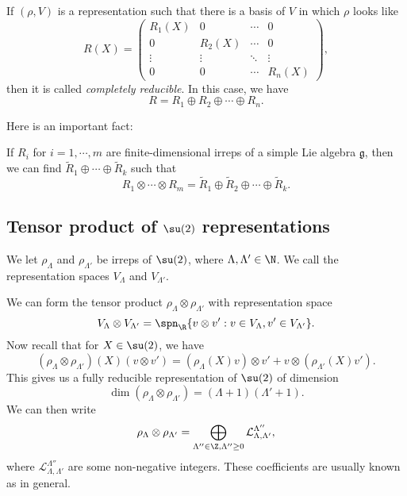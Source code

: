 \documentclass[a4paper]{article}
\begin{document}
\begin{defi}
  If $(\rho, V)$ is a representation such that there is a basis of $V$ in which $\rho$ looks like
  \[
    R(X) =
    \begin{pmatrix}
      R_1(X) & 0 & \cdots & 0\\
      0 & R_2(X) & \cdots & 0\\
      \vdots & \vdots & \ddots & \vdots\\
      0 & 0 & \cdots & R_n(X)
    \end{pmatrix},
  \]
  then it is called \emph{completely reducible}. In this case, we have
  \[
    R = R_1 \oplus R_2 \oplus \cdots \oplus R_n.
  \]
\end{defi}

Here is an important fact:
\begin{thm}
  If $R_i$ for $i = 1,\cdots, m$ are finite-dimensional irreps of a simple Lie algebra $\mathfrak{g}$, then we can find $\tilde{R}_1 \oplus \cdots \oplus \tilde{R}_k$ such that
  \[
    R_1 \otimes \cdots \otimes R_m = \tilde{R}_1 \oplus \tilde{R}_2 \oplus \cdots \oplus \tilde{R}_k.
  \]
\end{thm}

\subsection{Tensor product of \texorpdfstring{$\su(2)$}{su(2)} representations}
We let $\rho_\Lambda$ and $\rho_{\Lambda'}$ be irreps of $\su(2)$, where $\Lambda, \Lambda' \in \N$. We call the representation spaces $V_\Lambda$ and $V_{\Lambda'}$.

We can form the tensor product $\rho_\Lambda \otimes \rho_{\Lambda'}$ with representation space
\[
  V_\Lambda \otimes V_{\Lambda'} = \spn_\R \{v \otimes v': v \in V_\Lambda, v' \in V_{\Lambda'}\}.
\]
Now recall that for $X \in \su(2)$, we have
\[
  (\rho_\Lambda \otimes \rho_{\Lambda'})(X)(v \otimes v') = (\rho_\Lambda(X)v) \otimes v' + v \otimes (\rho_{\Lambda'}(X)v').
\]
This gives us a fully reducible representation of $\su(2)$ of dimension
\[
  \dim (\rho_\Lambda \otimes \rho_{\Lambda'}) = (\Lambda + 1)(\Lambda' + 1).
\]
We can then write
\[
  \rho_\Lambda \otimes \rho_{\Lambda'} = \bigoplus_{\Lambda'' \in \Z, \Lambda'' \geq 0} \mathcal{L}^{\Lambda''}_{\Lambda, \Lambda'},
\]
where $\mathcal{L}^{\Lambda''}_{\Lambda, \Lambda'}$ are some non-negative integers. These coefficients are usually known as  in general.
\end{document}
